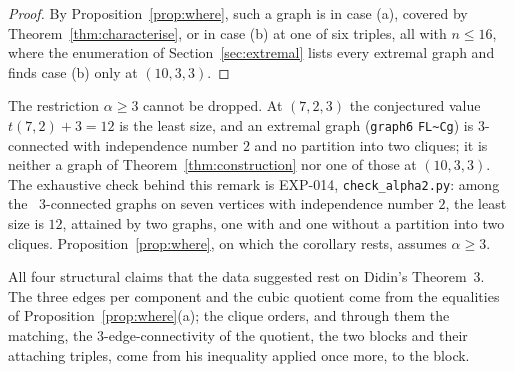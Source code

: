 \begin{proof}
By Proposition~\ref{prop:where}, such a graph is in case (a), covered by Theorem~\ref{thm:characterise}, or in case
(b) at one of six triples, all with $n\le16$, where the enumeration of Section~\ref{sec:extremal} lists every extremal
graph and finds case (b) only at $(10,3,3)$.
\end{proof}

The restriction $\alpha\ge3$ cannot be dropped. At $(7,2,3)$ the conjectured value $t(7,2)+3=12$ is the least size,
and an extremal graph (\texttt{graph6} \texttt{FL\textasciitilde Cg}) is $3$-connected with independence number $2$ and
no partition into two cliques; it is neither a graph of Theorem~\ref{thm:construction} nor one of those at
$(10,3,3)$. The exhaustive check behind this remark is EXP-014, \texttt{check\_alpha2.py}: among the \nalphatwo\
$3$-connected graphs on seven vertices with independence number $2$, the least size is $12$, attained by two graphs,
one with and one without a partition into two cliques. Proposition~\ref{prop:where}, on which the corollary rests, assumes $\alpha\ge3$.

All four structural claims that the data suggested rest on Didin's Theorem~3. The three edges per component and the
cubic quotient come from the equalities of Proposition~\ref{prop:where}(a); the clique orders, and through them the
matching, the $3$-edge-connectivity of the quotient, the two blocks and their attaching triples, come from his
inequality applied once more, to the block.
